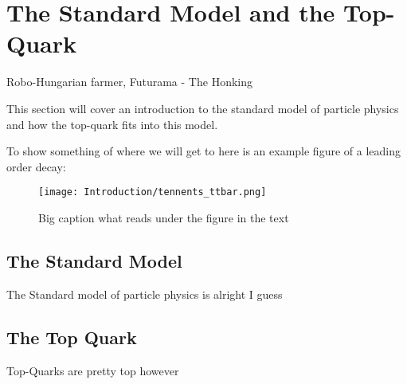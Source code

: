 
\chapter{The Standard Model and the Top-Quark}
\label{chap::Theory}


%
{Robo-Hungarian farmer, Futurama - The Honking}

This section will cover an introduction to the standard model of particle physics and how the top-quark fits into this model. 

To show something of where we will get to here is an example figure of a leading order \ljets \ttbar decay:
\begin{figure}[tbph]
\centering
\texttt{[image: Introduction/tennents\_ttbar.png]}
\caption[Short caption that shows up in list-of-figures]{Big caption what reads under the figure in the text}
\label{fig::example}
\end{figure}

\section{The Standard Model}
\label{sec::TheorySM}
The Standard model of particle physics is alright I guess

\section{The Top Quark}
\label{sec::TheoryTopQuark}
Top-Quarks are pretty top however

